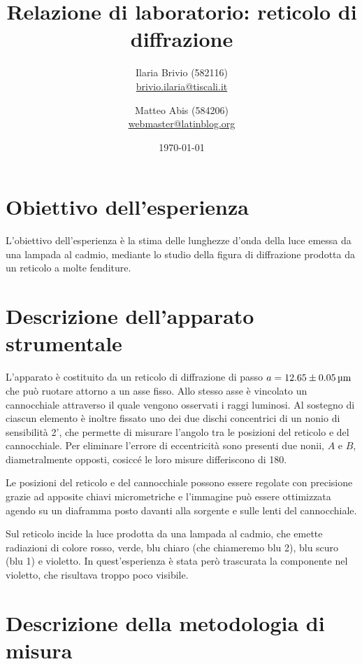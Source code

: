 \documentclass[italian,a4paper]{article}
\begin{document}
\title{Relazione di laboratorio: reticolo di diffrazione}
\author{\normalsize Ilaria Brivio (582116)\\%
\normalsize \url{brivio.ilaria@tiscali.it}%
\and %
\normalsize Matteo Abis (584206)\\ %
\normalsize \url{webmaster@latinblog.org}}
\date{\today}
\maketitle
\section{Obiettivo dell'esperienza}
L'obiettivo dell'esperienza è la stima delle lunghezze d'onda della luce emessa da una lampada al cadmio, mediante lo studio della figura di diffrazione prodotta da un reticolo a molte fenditure.

\section{Descrizione dell'apparato strumentale}
L'apparato è costituito da un reticolo di diffrazione di passo
$a=\unit[12.65 \pm 0.05]{\micro m}$ che può ruotare attorno a un asse fisso.
Allo stesso asse è vincolato un cannocchiale attraverso il quale vengono
osservati i raggi luminosi. Al sostegno di ciascun elemento è inoltre
fissato uno dei due dischi concentrici di un nonio di sensibilità 2', che
permette di misurare l'angolo tra le posizioni del reticolo e del
cannocchiale. Per eliminare l'errore di eccentricità sono presenti due
nonii, $A$ e $B$, diametralmente opposti, cosicc\'e le loro misure differiscono di 180\textdegree.

Le posizioni del reticolo e del cannocchiale possono essere regolate con precisione grazie ad apposite chiavi micrometriche e l'immagine può essere ottimizzata agendo su un diaframma posto davanti alla sorgente e sulle lenti del cannocchiale.

Sul reticolo incide la luce prodotta da una lampada al cadmio, che emette radiazioni di colore rosso, verde, blu chiaro (che chiameremo blu 2), blu scuro (blu 1) e violetto. In quest'esperienza è stata però trascurata la componente nel violetto, che risultava troppo poco visibile.

\section{Descrizione della metodologia di misura}
\end{document}
